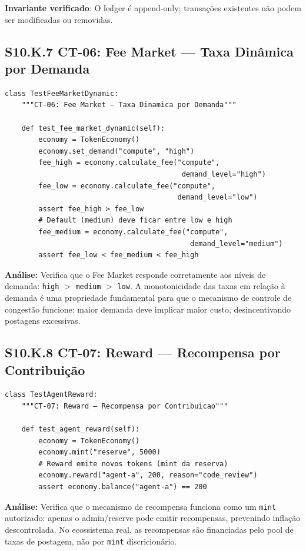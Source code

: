 \textbf{Invariante verificado}: O ledger é append-only; transações existentes não podem ser modificadas ou removidas.

\subsection*{S10.K.7 CT-06: Fee Market --- Taxa Dinâmica por Demanda}

\begin{verbatim}
class TestFeeMarketDynamic:
    """CT-06: Fee Market — Taxa Dinamica por Demanda"""

    def test_fee_market_dynamic(self):
        economy = TokenEconomy()
        economy.set_demand("compute", "high")
        fee_high = economy.calculate_fee("compute",
                                          demand_level="high")
        fee_low = economy.calculate_fee("compute",
                                         demand_level="low")
        assert fee_high > fee_low
        # Default (medium) deve ficar entre low e high
        fee_medium = economy.calculate_fee("compute",
                                            demand_level="medium")
        assert fee_low < fee_medium < fee_high
\end{verbatim}

\textbf{Análise:} Verifica que o Fee Market responde corretamente aos níveis de demanda: \texttt{high} $>$ \texttt{medium} $>$ \texttt{low}. A monotonicidade das taxas em relação à demanda é uma propriedade fundamental para que o mecanismo de controle de congestão funcione: maior demanda deve implicar maior custo, desincentivando postagens excessivas.

\subsection*{S10.K.8 CT-07: Reward --- Recompensa por Contribuição}

\begin{verbatim}
class TestAgentReward:
    """CT-07: Reward — Recompensa por Contribuicao"""

    def test_agent_reward(self):
        economy = TokenEconomy()
        economy.mint("reserve", 5000)
        # Reward emite novos tokens (mint da reserva)
        economy.reward("agent-a", 200, reason="code_review")
        assert economy.balance("agent-a") == 200
\end{verbatim}

\textbf{Análise:} Verifica que o mecanismo de recompensa funciona como um \texttt{mint} autorizado: apenas o admin/reserve pode emitir recompensas, prevenindo inflação descontrolada. No ecossistema real, as recompensas são financiadas pelo pool de taxas de postagem, não por \texttt{mint} discricionário.

